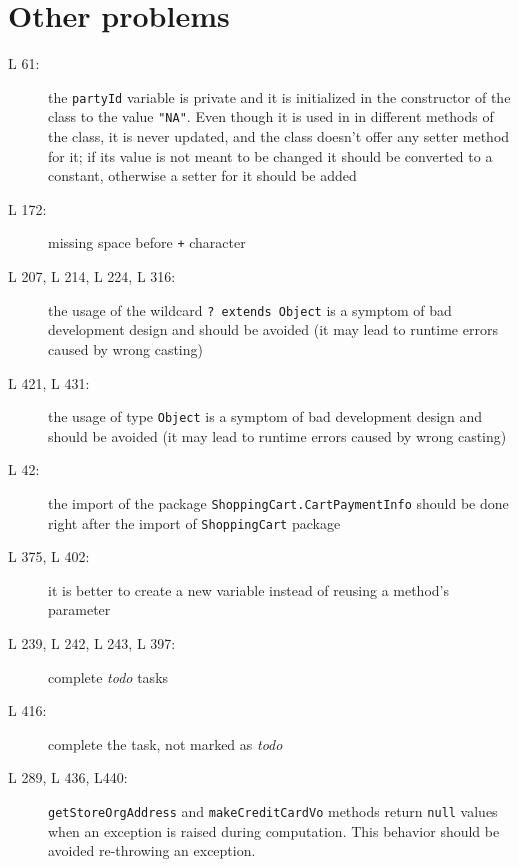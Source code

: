 \section{Other problems}
\begin{description}
	\item[L 61:] the {\tt partyId} variable is private and it is initialized in the constructor of the class to the value {\tt "\textunderscore NA\textunderscore"}. Even though it is used in in different methods of the class, it is never updated, and the class doesn't offer any setter method for it; if its value is not meant to be changed it should be converted to a constant, otherwise a setter for it should be added
	\item[L 172:] missing space before {\tt +} character
	\item[L 207, L 214, L 224, L 316:] the usage of the wildcard {\tt ? extends Object} is a symptom of bad development design and should be avoided (it may lead to runtime errors caused by wrong casting)
	\item[L 421, L 431:] the usage of type {\tt Object} is a symptom of bad development design and should be avoided (it may lead to runtime errors caused by wrong casting)
	\item[L 42:] the import of the package {\tt ShoppingCart.CartPaymentInfo} should be done right after the import of {\tt ShoppingCart} package
	\item[L 375, L 402:] it is better to create a new variable instead of reusing a method's parameter
	\item[L 239, L 242, L 243, L 397:]  complete \emph{todo} tasks
	\item[L 416:] complete the task, not marked as \emph{todo}
	\item[L 289, L 436, L440:] {\tt getStoreOrgAddress} and {\tt makeCreditCardVo} methods return {\tt null} values when an exception is raised during computation. This behavior should be avoided re-throwing an exception.
\end{description}
